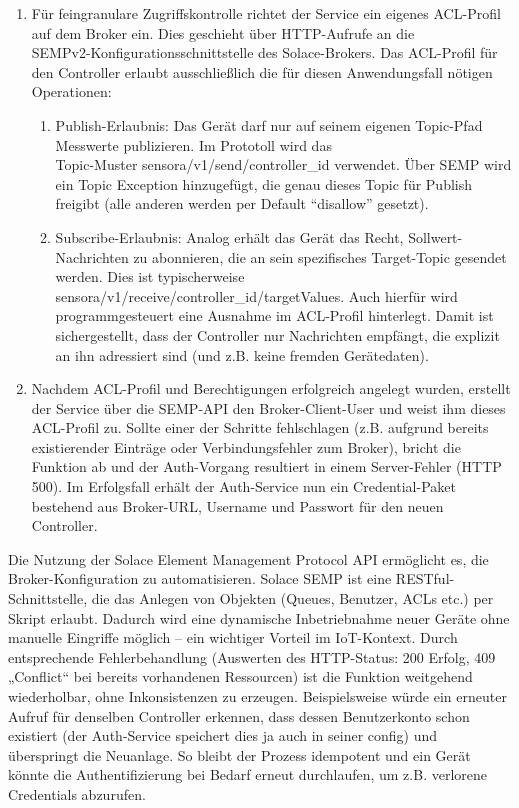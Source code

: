 \begin{enumerate}
\begin{enumerate}
        \item Für feingranulare Zugriffskontrolle richtet der Service ein eigenes ACL-Profil auf dem Broker ein. Dies geschieht über HTTP-Aufrufe an die \\SEMPv2-Konfigurationsschnittstelle des Solace-Brokers. Das ACL-Profil für den Controller erlaubt ausschließlich die für diesen Anwendungsfall nötigen Operationen:
        \begin{enumerate}
            \item Publish-Erlaubnis: Das Gerät darf nur auf seinem eigenen Topic-Pfad Messwerte publizieren. Im Prototoll wird das \\ Topic-Muster sensora/v1/send/{controller\_id} verwendet. Über SEMP wird ein Topic Exception hinzugefügt, die genau dieses Topic für Publish freigibt (alle anderen werden per Default “disallow” gesetzt).
            \item Subscribe-Erlaubnis: Analog erhält das Gerät das Recht, Sollwert-Nachrichten zu abonnieren, die an sein spezifisches Target-Topic gesendet werden. Dies ist typischerweise sensora/v1/receive/{controller\_id}/targetValues. Auch hierfür wird programmgesteuert eine Ausnahme im ACL-Profil hinterlegt. Damit ist sichergestellt, dass der Controller nur Nachrichten empfängt, die explizit an ihn adressiert sind (und z.B. keine fremden Gerätedaten).
        \end{enumerate}
        \item Nachdem ACL-Profil und Berechtigungen erfolgreich angelegt wurden, erstellt der Service über die SEMP-API den Broker-Client-User und weist ihm dieses ACL-Profil zu. Sollte einer der Schritte fehlschlagen (z.B. aufgrund bereits existierender Einträge oder Verbindungsfehler zum Broker), bricht die Funktion ab und der Auth-Vorgang resultiert in einem Server-Fehler (HTTP 500). Im Erfolgsfall erhält der Auth-Service nun ein Credential-Paket bestehend aus Broker-URL, Username und Passwort für den neuen Controller.
    \end{enumerate}
    Die Nutzung der Solace Element Management Protocol API ermöglicht es, die Broker-Konfiguration zu automatisieren. Solace SEMP ist eine RESTful-Schnittstelle\cite{SolaceSEMP}, die das Anlegen von Objekten (Queues, Benutzer, ACLs etc.) per Skript erlaubt. Dadurch wird eine dynamische Inbetriebnahme neuer Geräte ohne manuelle Eingriffe möglich – ein wichtiger Vorteil im IoT-Kontext. Durch entsprechende Fehlerbehandlung (Auswerten des HTTP-Status: 200 Erfolg, 409 „Conflict“ bei bereits vorhandenen Ressourcen) ist die Funktion weitgehend wiederholbar, ohne Inkonsistenzen zu erzeugen. Beispielsweise würde ein erneuter Aufruf für denselben Controller erkennen, dass dessen Benutzerkonto schon existiert (der Auth-Service speichert dies ja auch in seiner config) und überspringt die Neuanlage. So bleibt der Prozess idempotent und ein Gerät könnte die Authentifizierung bei Bedarf erneut durchlaufen, um z.B. verlorene Credentials abzurufen.

\end{enumerate}
